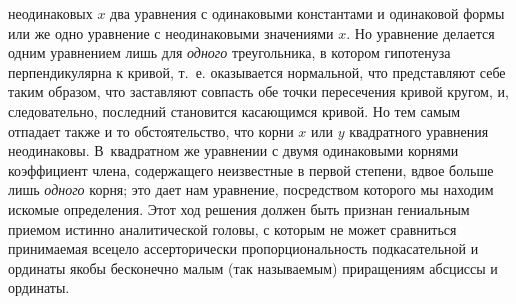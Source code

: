 неодинаковых $x$ два уравнения с одинаковыми
константами и одинаковой формы или же одно уравнение с неодинаковыми
значениями $x$. Но уравнение делается одним уравнением лишь для
{\em одного} треугольника, в котором гипотенуза
перпендикулярна к кривой, т.~е. оказывается нормальной, что представляют
себе таким образом, что заставляют совпасть обе точки пересечения кривой
кругом, и, следовательно, последний становится касающимся кривой. Но тем
самым отпадает также и то обстоятельство, что корни
$x$ или $y$ квадратного уравнения неодинаковы. В~квадратном
же уравнении с двумя одинаковыми корнями коэффициент члена, содержащего
неизвестные в первой степени, вдвое больше лишь
{\em одного} корня; это дает нам уравнение, посредством
которого мы находим искомые определения. Этот ход решения должен быть
признан гениальным приемом истинно аналитической головы, с которым не может
сравниться принимаемая всецело ассерторически пропорциональность
подкасательной и ординаты якобы бесконечно малым (так называемым)
приращениям абсциссы и ординаты.

